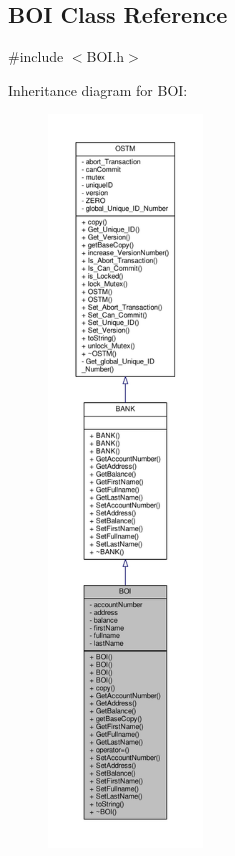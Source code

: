 \hypertarget{class_b_o_i}{}\subsection{B\+OI Class Reference}
\label{class_b_o_i}


{\ttfamily \#include $<$B\+O\+I.\+h$>$}



Inheritance diagram for B\+OI\+:
\nopagebreak
\begin{figure}[H]
\begin{center}
\leavevmode
\includegraphics[height=550pt]{class_b_o_i__inherit__graph}
\end{center}
\end{figure}


